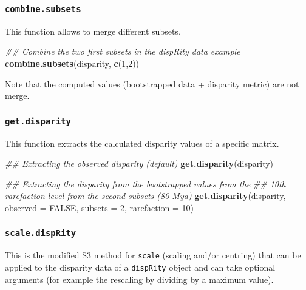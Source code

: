\documentclass[
]{book}
\newenvironment{Shaded}{\begin{snugshade}}{\end{snugshade}}
\newcommand{\CommentTok}[1]{\textcolor[rgb]{0.56,0.35,0.01}{\textit{#1}}}
\newcommand{\DataTypeTok}[1]{\textcolor[rgb]{0.13,0.29,0.53}{#1}}
\newcommand{\DecValTok}[1]{\textcolor[rgb]{0.00,0.00,0.81}{#1}}
\newcommand{\KeywordTok}[1]{\textcolor[rgb]{0.13,0.29,0.53}{\textbf{#1}}}
\newcommand{\NormalTok}[1]{#1}
\newcommand{\OtherTok}[1]{\textcolor[rgb]{0.56,0.35,0.01}{#1}}
\begin{document}
\hypertarget{combine.subsets}{%
\subsubsection{\texorpdfstring{\texttt{combine.subsets}}{combine.subsets}}\label{combine.subsets}}

This function allows to merge different subsets.

\begin{Shaded}
\begin{Highlighting}[]
\CommentTok{\#\# Combine the two first subsets in the dispRity data example}
\KeywordTok{combine.subsets}\NormalTok{(disparity, }\KeywordTok{c}\NormalTok{(}\DecValTok{1}\NormalTok{,}\DecValTok{2}\NormalTok{))}
\end{Highlighting}
\end{Shaded}

Note that the computed values (bootstrapped data + disparity metric) are not merge.

\hypertarget{get.disparity}{%
\subsubsection{\texorpdfstring{\texttt{get.disparity}}{get.disparity}}\label{get.disparity}}

This function extracts the calculated disparity values of a specific matrix.

\begin{Shaded}
\begin{Highlighting}[]
\CommentTok{\#\# Extracting the observed disparity (default)}
\KeywordTok{get.disparity}\NormalTok{(disparity)}

\CommentTok{\#\# Extracting the disparity from the bootstrapped values from the}
\CommentTok{\#\# 10th rarefaction level from the second subsets (80 Mya)}
\KeywordTok{get.disparity}\NormalTok{(disparity, }\DataTypeTok{observed =} \OtherTok{FALSE}\NormalTok{, }\DataTypeTok{subsets =} \DecValTok{2}\NormalTok{, }\DataTypeTok{rarefaction =} \DecValTok{10}\NormalTok{)}
\end{Highlighting}
\end{Shaded}

\hypertarget{scale.disprity}{%
\subsubsection{\texorpdfstring{\texttt{scale.dispRity}}{scale.dispRity}}\label{scale.disprity}}

This is the modified S3 method for \texttt{scale} (scaling and/or centring) that can be applied to the disparity data of a \texttt{dispRity} object and can take optional arguments (for example the rescaling by dividing by a maximum value).
\end{document}
